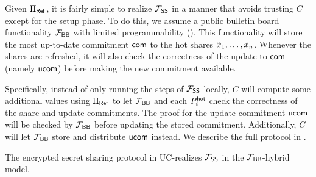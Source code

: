 Given $\Pi_{\sf Ref}$, it is fairly simple to realize $\mathcal{F}_\mathsf{SS}$ in a manner that avoids trusting $C$ except for the setup phase.
To do this, we assume a public bulletin board functionality $\mathcal{F}_\mathsf{BB}$ with limited programmability (). This functionality will store the most up-to-date commitment $\mathsf{com}$ to the hot shares $\tilde{x}_1, \dots, \tilde{x}_n$. Whenever the shares are refreshed, it will also check the correctness of the update to $\mathsf{com}$ (namely $\mathsf{ucom}$) before making the new commitment available.

Specifically, instead of only running the steps of $\mathcal{F}_\mathsf{SS}$ locally, $C$ will compute some additional values using $\Pi_{\sf Ref}$ to let $\mathcal{F}_\mathsf{BB}$ and each $P_i^{\mathsf{hot}}$ check the correctness of the share and update commitments. 
The proof for the update commitment $\mathsf{ucom}$ will be checked by $\mathcal{F}_\mathsf{BB}$ before updating the stored commitment. 
Additionally, $C$ will let $\mathcal{F}_\mathsf{BB}$ store and distribute $\mathsf{ucom}$ instead. 
\renewcommand{\chblue}[1]{\textcolor{blue}{#1}}
We describe the full protocol in . %




\renewcommand{\chblue}[1]{#1}

\begin{theorem}\label{thm:fs-protocol}
The encrypted secret sharing protocol in  UC-realizes $\mathcal{F}_\mathsf{SS}$ in the $\mathcal{F}_\mathsf{BB}$-hybrid model.
\end{theorem}

